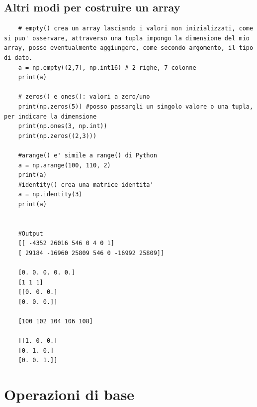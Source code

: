 \newpage

\subsection{Altri modi per costruire un array}

\begin{lstlisting}
	# empty() crea un array lasciando i valori non inizializzati, come si puo' osservare, attraverso una tupla impongo la dimensione del mio array, posso eventualmente aggiungere, come secondo argomento, il tipo di dato.
	a = np.empty((2,7), np.int16) # 2 righe, 7 colonne
	print(a)
	
	# zeros() e ones(): valori a zero/uno
	print(np.zeros(5)) #posso passargli un singolo valore o una tupla, per indicare la dimensione
	print(np.ones(3, np.int))
	print(np.zeros((2,3)))
	
	#arange() e' simile a range() di Python
	a = np.arange(100, 110, 2)
	print(a)
	#identity() crea una matrice identita'
	a = np.identity(3)
	print(a)

	
	#Output
	[[ -4352 26016 546 0 4 0 1]
	[ 29184 -16960 25809 546 0 -16992 25809]]
	
	[0. 0. 0. 0. 0.]
	[1 1 1]
	[[0. 0. 0.]
	[0. 0. 0.]]
	
	[100 102 104 106 108]
	
	[[1. 0. 0.]
	[0. 1. 0.]
	[0. 0. 1.]]
\end{lstlisting}

\newpage

\section{Operazioni di base}

